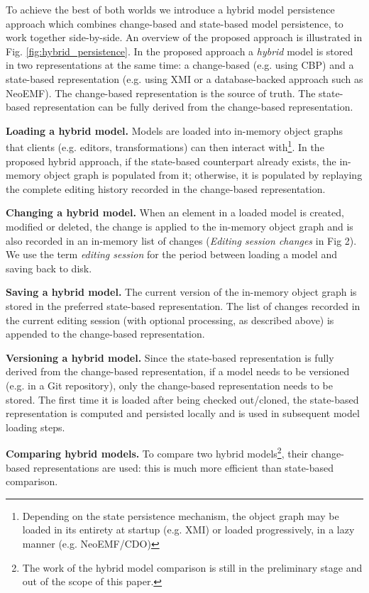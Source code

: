 \documentclass{llncs}
\begin{document}
\vspace{-15pt}
To achieve the best of both worlds we introduce a hybrid model persistence approach which combines change-based and state-based model persistence, to work together side-by-side. An overview of the proposed approach is illustrated in Fig. \ref{fig:hybrid_persistence}. In the proposed approach a \textit{hybrid} model is stored in two representations at the same time: a change-based (e.g. using CBP) and a state-based representation (e.g. using XMI or a database-backed approach such as NeoEMF). The change-based representation is the source of truth. The state-based representation can be fully derived from the change-based representation.

\textbf{Loading a hybrid model.} Models are loaded into in-memory object graphs that clients (e.g. editors, transformations) can then interact with\footnote{Depending on the state persistence mechanism, the object graph may be loaded in its entirety at startup (e.g. XMI) or loaded progressively, in a lazy manner (e.g. NeoEMF/CDO)}. In the proposed hybrid approach, if the state-based counterpart already exists, the in-memory object graph is populated from it; otherwise, it is populated by replaying the complete editing history recorded in the change-based representation.

\textbf{Changing a hybrid model.} When an element in a loaded model is created, modified or deleted, the change is applied to the in-memory object graph and is also recorded in an in-memory list of changes (\textit{Editing session changes} in Fig 2). We use the term \emph{editing session} for the period between loading a model and saving back to disk. 

\textbf{Saving a hybrid model.} The current version of the in-memory object graph is stored in the preferred state-based representation. The list of changes recorded in the current editing session (with optional processing, as described above) is appended to the change-based representation.

\textbf{Versioning a hybrid model.} Since the state-based representation is fully derived from the change-based representation, if a model needs to be versioned (e.g. in a Git repository), only the change-based representation needs to be stored. The first time it is loaded after being checked out/cloned, the state-based representation is computed and persisted locally and is used in subsequent model loading steps.

\textbf{Comparing hybrid models.} To compare two hybrid models\footnote{The work of the hybrid model comparison is still in the preliminary stage and out of the scope of this paper.}, their change-based representations are used: this is much more efficient than state-based comparison. 
\end{document}
